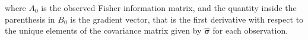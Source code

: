 \noindent where
$A_0$
is the observed Fisher information matrix,
and the quantity inside the parenthesis
in
$B_0$
is the gradient vector,
that is the first derivative
with respect
to the unique elements of the covariance matrix
given by $\hat{\boldsymbol{\sigma}}$
for each observation.
